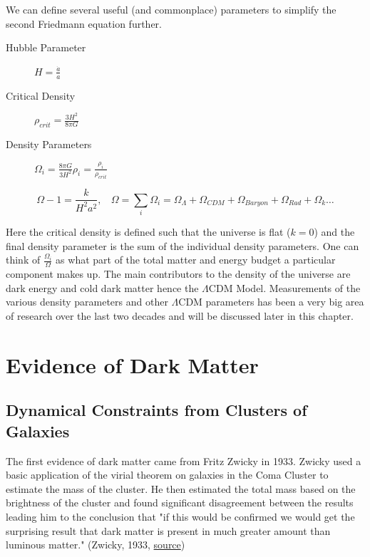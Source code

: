 \documentclass[12pt,twoside]{report}
\begin{document}
	We can define several useful (and commonplace) parameters to simplify the second Friedmann equation further.
	\begin{description}
		\item[Hubble Parameter] $ H = \frac{\dot{a}}{a} $
		\item[Critical Density] $ \rho_{crit} = \frac{3H^2}{8 \pi G} $
		\item[Density Parameters] $ \Omega_{i} = \frac{8 \pi G}{3H^2} \rho_{i} = \frac{\rho_{i}}{\rho_{crit}} $
	\end{description}	
	
	\begin{equation}
		\Omega - 1 = \frac{k}{H^2 a^2}, \ \ \ \ \Omega = \sum_{i} \Omega_{i} = \Omega_{\Lambda} + \Omega_{CDM} + \Omega_{Baryon} + \Omega_{Rad} + \Omega_{k} \ldots 
	\end{equation}
	
	Here the critical density is defined such that the universe is flat ($k=0$) and the final density parameter is the sum of the individual density parameters.  One can think of $\frac{\Omega_i}{\Omega}$ as what part of the total matter and energy budget a particular component makes up.  The main contributors to the density of the universe are dark energy and cold dark matter hence the $\Lambda$CDM Model.  Measurements of the various density parameters and other $\Lambda$CDM parameters has been a very big area of research over the last two decades and will be discussed later in this chapter.
	
\section{Evidence of Dark Matter}

\subsection{Dynamical Constraints from Clusters of Galaxies}

The first evidence of dark matter came from Fritz Zwicky in 1933.  Zwicky used a basic application of the virial theorem on galaxies in the Coma Cluster	to estimate the mass of the cluster.  He then  estimated the total mass based on the brightness of the cluster and found significant disagreement between the results leading him to the conclusion that "if this would be confirmed we would get the surprising result that dark matter is present in much greater amount than luminous matter." (Zwicky, 1933, \href{http://www.ymambrini.com/My_World/History_files/Zwicky.pdf}{source})
	
\end{document}
